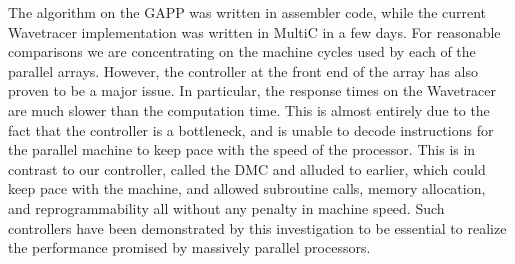 The algorithm on the GAPP was written in assembler code, while the 
current Wavetracer implementation was written in MultiC 
in a few days.  For reasonable comparisons we are concentrating on 
the machine cycles used by each of the parallel arrays.  However, 
the controller at the front end of the array has also proven 
to be a major issue.  In particular, the response times on the 
Wavetracer are much slower than the computation time.  This is 
almost entirely due to the fact that the controller is a 
bottleneck, and is unable to decode instructions for the parallel 
machine to keep pace with the speed of the processor.  This is in 
contrast to our controller, called the DMC and alluded to earlier, 
which could keep pace with the machine, and allowed subroutine calls, 
memory allocation, and reprogrammability all without any penalty 
in machine speed.  Such controllers have been demonstrated 
by this investigation to be essential to realize the performance 
promised by massively parallel processors.

